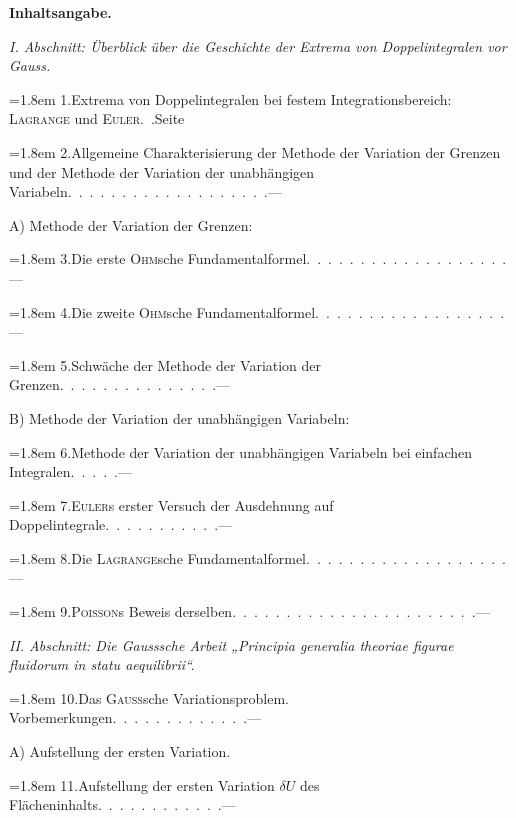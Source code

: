 \clearpage\begingroup\NoSourceHead{}
\newcommand{\BCrow}[5]{\par\noindent\hangindent=1.8em\hangafter=1 #1\enspace #2\hfill\mbox{#3}\nobreak\quad #4\enspace #5\par}
\newcommand{\BCsub}[1]{\par\smallskip\noindent #1\par}
\begin{center}\bfseries Inhaltsangabe.\end{center}
\small
\begin{center}\end{center}
\BCsub{\textit{I. Abschnitt: Überblick über die Geschichte der Extrema von Doppelintegralen vor Gauss.}}
\BCrow{1.}{Extrema von Doppelintegralen bei festem Integrationsbereich: \textsc{Lagrange} und \textsc{Euler}}{.\ .}{Seite}{4}
\BCrow{2.}{Allgemeine Charakterisierung der Methode der Variation der Grenzen und der Methode der Variation der unabhängigen Variabeln}{.\ .\ .\ .\ .\ .\ .\ .\ .\ .\ .\ .\ .\ .\ .\ .\ .\ .\ .}{—}{6}
\begin{center}A) Methode der Variation der Grenzen:\end{center}
\BCrow{3.}{Die erste \textsc{Ohm}sche Fundamentalformel}{.\ .\ .\ .\ .\ .\ .\ .\ .\ .\ .\ .\ .\ .\ .\ .\ .\ .\ .}{—}{7}
\BCrow{4.}{Die zweite \textsc{Ohm}sche Fundamentalformel}{.\ .\ .\ .\ .\ .\ .\ .\ .\ .\ .\ .\ .\ .\ .\ .\ .\ .}{—}{9}
\BCrow{5.}{Schwäche der Methode der Variation der Grenzen}{.\ .\ .\ .\ .\ .\ .\ .\ .\ .\ .\ .\ .\ .\ .}{—}{10}
\begin{center}B) Methode der Variation der unabhängigen Variabeln:\end{center}
\BCrow{6.}{Methode der Variation der unabhängigen Variabeln bei einfachen Integralen}{.\ .\ .\ .\ .}{—}{12}
\BCrow{7.}{\textsc{Euler}s erster Versuch der Ausdehnung auf Doppelintegrale}{.\ .\ .\ .\ .\ .\ .\ .\ .\ .\ .}{—}{14}
\BCrow{8.}{Die \textsc{Lagrange}sche Fundamentalformel}{.\ .\ .\ .\ .\ .\ .\ .\ .\ .\ .\ .\ .\ .\ .\ .\ .\ .\ .}{—}{16}
\BCrow{9.}{\textsc{Poisson}s Beweis derselben}{.\ .\ .\ .\ .\ .\ .\ .\ .\ .\ .\ .\ .\ .\ .\ .\ .\ .\ .\ .\ .\ .\ .}{—}{18}
\BCsub{\textit{II. Abschnitt: Die Gausssche Arbeit „Principia generalia theoriae figurae fluidorum in statu aequilibrii“.}}
\BCrow{10.}{Das \textsc{Gauss}sche Variationsproblem. Vorbemerkungen}{.\ .\ .\ .\ .\ .\ .\ .\ .\ .\ .\ .\ .}{—}{20}
\BCsub{A) Aufstellung der ersten Variation.}
\BCrow{11.}{Aufstellung der ersten Variation $\delta U$ des Flächeninhalts}{.\ .\ .\ .\ .\ .\ .\ .\ .\ .\ .\ .}{—}{23}
